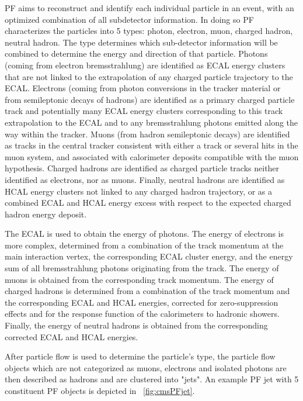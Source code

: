  PF aims to reconstruct and identify each individual particle in an event, with an optimized combination of all subdetector information. In doing so PF characterizes the particles into 5 types: photon, electron, muon, charged hadron, neutral hadron. The type determines which sub-detector information will be combined to determine the energy and direction of that particle. Photons (\eg coming from electron bremsstrahlung) are identified as ECAL energy clusters that are not linked to the extrapolation of any charged particle trajectory to the ECAL. Electrons (\eg coming from photon conversions in the tracker material or from semileptonic decays of hadrons) are identified as a primary charged particle track and potentially many ECAL energy clusters corresponding to this track extrapolation to the ECAL and to any bremsstrahlung photons emitted along the way within the tracker. Muons (\eg from  hadron semileptonic decays) are identified as tracks in the central tracker consistent with either a track or several hits in the muon system, and associated with calorimeter deposits compatible with the muon hypothesis. Charged hadrons are identified as charged particle tracks neither identified as electrons, nor as muons. Finally, neutral hadrons are identified as HCAL energy clusters not linked to any charged hadron trajectory, or as a combined ECAL and HCAL energy excess with respect to the expected charged hadron energy deposit.

The ECAL is used to obtain the energy of photons. The energy of electrons is more complex, determined from a combination of the track momentum at the main interaction vertex, the corresponding ECAL cluster energy, and the energy sum of all bremsstrahlung photons originating from the track. The energy of muons is obtained from the corresponding track momentum. The energy of charged hadrons is determined from a combination of the track momentum and the corresponding ECAL and HCAL energies, corrected for zero-suppression effects and for the response function of the calorimeters to hadronic showers. Finally, the energy of neutral hadrons is obtained from the corresponding corrected ECAL and HCAL energies.

After particle flow is used to determine the particle's type, the particle flow objects which are not categorized as muons, electrons and isolated photons are then described as hadrons and are clustered into "jets". An example PF jet with 5 constituent PF objects is depicted in ~\ref{fig:cmsPFjet}.

